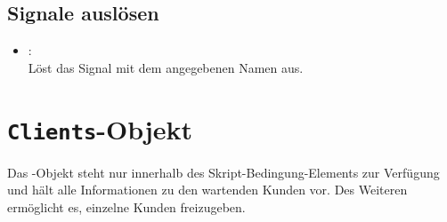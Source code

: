 \section{Signale auslösen}

\begin{itemize}

\item
{}:\\
Löst das Signal mit dem angegebenen Namen aus.

\end{itemize}

\chapter{\texttt{Clients}-Objekt}

Das -Objekt steht nur innerhalb des Skript-Bedingung-Elements zur Verfügung
und hält alle Informationen zu den wartenden Kunden vor. Des Weiteren ermöglicht es,
einzelne Kunden freizugeben.

